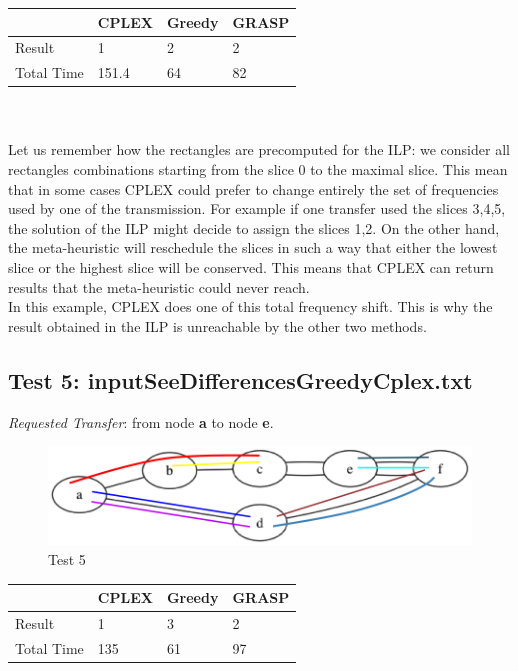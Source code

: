 \documentclass[11pt,a4paper]{article}
\begin{document}
\begin{tabular}{| l | l | l | l |}
\hline
 & CPLEX & Greedy & GRASP \\ \hline
Result & 1 & 2 & 2 \\ \hline
Total Time & 151.4 & 64 & 82 \\ \hline
\end{tabular}\\\\

Let us remember how the rectangles are precomputed for the ILP: we consider all rectangles combinations starting from the slice 0 to the maximal slice. This mean that in some cases CPLEX could prefer to change entirely the set of frequencies used by one of the transmission. For example if one transfer used the slices 3,4,5, the solution of the ILP might decide to assign the slices 1,2.  On the other hand, the meta-heuristic will reschedule the slices in such a way that either the lowest slice or the highest slice will be conserved. This means that CPLEX can return results that the meta-heuristic could never reach.\\

In this example, CPLEX does one of this total frequency shift. This is why the result obtained in the ILP is unreachable by the other two methods.

\subsection{Test 5: inputSeeDifferencesGreedyCplex.txt}

\textit{Requested Transfer}: from node \textbf{a} to node \textbf{e}.\\

\begin{figure}[H]
  \centering
    \includegraphics[scale=0.7]{inputSeeDifferencesGreedyCplex.png}
  \caption{Test 5}
  \label{fig:test5}
\end{figure}

\begin{tabular}{| l | l | l | l |}
\hline
 & CPLEX & Greedy & GRASP \\ \hline
Result & 1 & 3 & 2 \\ \hline
Total Time & 135 & 61 & 97 \\ \hline
\end{tabular}\\\\
\end{document}
